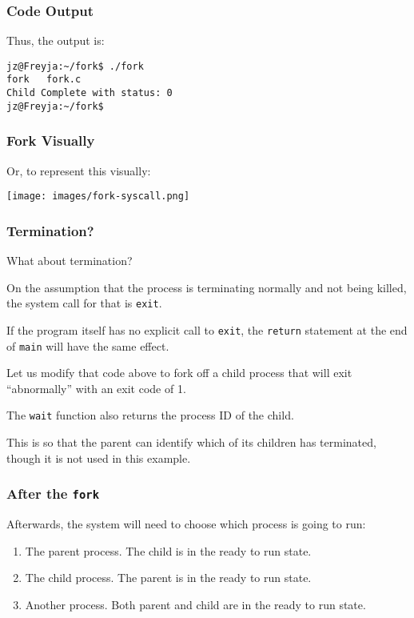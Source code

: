 \begin{frame}[fragile]
	\frametitle{Code Output}

	Thus, the output is:
	\begin{verbatim}
jz@Freyja:~/fork$ ./fork 
fork   fork.c
Child Complete with status: 0
jz@Freyja:~/fork$ 
\end{verbatim}


\end{frame}

\begin{frame}
	\frametitle{Fork Visually}

	Or, to represent this visually:

	\begin{center}
		\texttt{[image: images/fork-syscall.png]}
	\end{center}

\end{frame}

\begin{frame}
	\frametitle{Termination?}

	What about termination?

	On the assumption that the process is terminating normally and not being killed, the system call for that is \texttt{exit}.

	If the program itself has no explicit call to \texttt{exit}, the \texttt{return} statement at the end of \texttt{main} will have the same effect.

	Let us modify that code above to fork off a child process that will exit ``abnormally'' with an exit code of 1.

	The \texttt{wait} function also returns the process ID of the child.

	This is so that the parent can identify which of its children has terminated, though it is not used in this example.

\end{frame}

\begin{frame}
	\frametitle{After the \texttt{fork}}

	Afterwards, the system will need to choose which process is going to run:

	\begin{enumerate}
		\item The parent process. The child is in the ready to run state.
		\item The child process. The parent is in the ready to run state.
		\item Another process. Both parent and child are in the ready to run state.
	\end{enumerate}

\end{frame}


